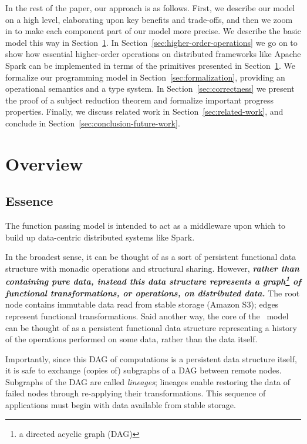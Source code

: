 \documentclass{jfp1}
\begin{document}
In the rest of the paper, our approach is as follows. First, we describe
our model on a high level, elaborating
upon key benefits and trade-offs, and then we zoom in to make each
component part of our model more precise. We describe the basic model
this way in Section~\ref{sec:basic-model}. In
Section~\ref{sec:higher-order-operations} we go on to show how
essential higher-order operations on distributed frameworks like
Apache Spark can be implemented in terms of the primitives presented
in Section~\ref{sec:basic-model}. We formalize our programming model
in Section~\ref{sec:formalization}, providing an operational semantics
and a type system. In Section~\ref{sec:correctness} we present the
proof of a subject reduction theorem and formalize important progress
properties. Finally, we discuss related work in
Section~\ref{sec:related-work}, and conclude in
Section~\ref{sec:conclusion-future-work}.

\section{Overview}
\label{sec:basic-model}

\subsection{Essence}

The function passing model is intended to act as a 
middleware upon which to build up data-centric distributed systems like Spark. 

In the broadest sense, it can be thought of as a sort of
persistent functional data structure with monadic operations and structural
sharing. However, {\bf\em rather than containing pure data, instead this data structure
represents a graph\footnote{a directed acyclic graph (DAG)} of functional transformations,
or operations, on distributed data.} The root node contains immutable data read from stable storage 
(\eg Amazon S3); edges represent functional transformations. 
Said another way, the core of the \FP~model can be thought of as a persistent functional 
data structure representing a history of the operations performed on some data, rather
than the data itself.

Importantly, since this DAG of computations is a persistent data structure
itself, it is safe to exchange (copies of) subgraphs of a DAG between remote
nodes. 
Subgraphs of the DAG are called \textit{lineages}; lineages enable restoring the 
data of failed nodes through re-applying their transformations. This sequence of 
applications must begin with data available from stable storage.
\end{document}
